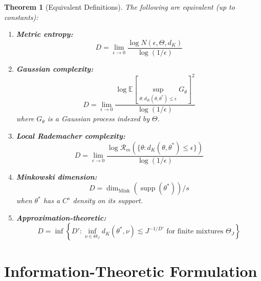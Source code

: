 \documentclass[11pt]{article}
\newtheorem{theorem}{Theorem}[section]
\theoremstyle{definition}
\DeclareMathOperator{\supp}{supp}
\newcommand{\E}{\mathbb{E}}
\begin{document}
\begin{theorem}[Equivalent Definitions]
\label{thm:equiv}
The following are equivalent (up to constants):
\begin{enumerate}[label=(\roman*)]
    \item \textbf{Metric entropy:}
    \begin{equation}
        D = \lim_{\epsilon \to 0} \frac{\log N(\epsilon, \Theta, d_K)}{\log(1/\epsilon)}
    \end{equation}
    
    \item \textbf{Gaussian complexity:}
    \begin{equation}
        D = \lim_{\epsilon \to 0} \frac{\log \E\left[\sup_{\theta : d_K(\theta, \theta^*) \leq \epsilon} G_\theta\right]^2}{\log(1/\epsilon)}
    \end{equation}
    where $G_\theta$ is a Gaussian process indexed by $\Theta$.
    
    \item \textbf{Local Rademacher complexity:}
    \begin{equation}
        D = \lim_{\epsilon \to 0} \frac{\log \mathcal{R}_m(\{\theta : d_K(\theta, \theta^*) \leq \epsilon\})}{\log(1/\epsilon)}
    \end{equation}
    
    \item \textbf{Minkowski dimension:}
    \begin{equation}
        D = \dim_{\mathrm{Mink}}(\supp(\theta^*)) / s
    \end{equation}
    when $\theta^*$ has a $C^s$ density on its support.
    
    \item \textbf{Approximation-theoretic:}
    \begin{equation}
        D = \inf\left\{D' : \inf_{\nu \in \Theta_J} d_K(\theta^*, \nu) \lesssim J^{-1/D'} \text{ for finite mixtures } \Theta_J\right\}
    \end{equation}
\end{enumerate}
\end{theorem}

\section{Information-Theoretic Formulation}
\end{document}
